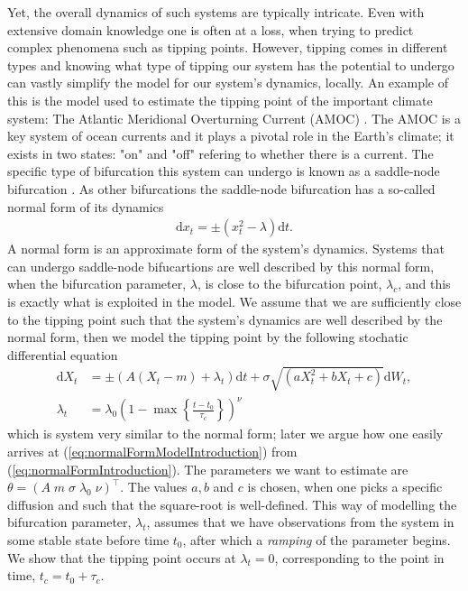 Yet, the overall dynamics of such systems are typically intricate. Even with extensive domain knowledge one is often at a loss, when trying to predict complex phenomena such as tipping points. However, tipping comes in different types and knowing what type of tipping our system has the potential to undergo can vastly simplify the model for our system's dynamics, locally. An example of this is the model used to estimate the tipping point of the important climate system: The Atlantic Meridional Overturning Current (AMOC) \cite{Ditlevsen2023}. The AMOC is a key system of ocean currents and it plays a pivotal role in the Earth's climate; it exists in two states: "on" and "off" refering to whether there is a current. The specific type of bifurcation this system can undergo is known as a saddle-node bifurcation \cite{Ditlevsen2023}\cite{Strogatz2019_gv}. As other bifurcations the saddle-node bifurcation has a so-called normal form of its dynamics 
\begin{align}
    \mathrm{d}x_t = \pm\left(x_t^2 - \lambda\right)\mathrm{d}t. \label{eq:normalFormIntroduction}
\end{align}
A normal form is an approximate form of the system's dynamics. Systems that can undergo saddle-node bifucartions are well described by this normal form, when the bifurcation parameter, $\lambda$, is close to the bifurcation point, $\lambda_c$, and this is exactly what is exploited in the model. We assume that we are sufficiently close to the tipping point such that the system's dynamics are well described by the normal form, then we model the tipping point by the following stochatic differential equation
\begin{align}
    \mathrm{d}X_t &= \pm(A(X_t - m) + \lambda_t)\mathrm{d}t + \sigma\sqrt{\left(aX_t^2 + bX_t + c\right)}\mathrm{d}W_t, \label{eq:normalFormModelIntroduction}\\
    \lambda_t &= \lambda_0\left(1 - \max\left\{\frac{t - t_0}{\tau_c}\right\}\right)^\nu \label{eq:lambdaRampDefinitionIntroduction}
\end{align}
which is system very similar to the normal form; later we argue how one easily arrives at (\ref{eq:normalFormModelIntroduction}) from (\ref{eq:normalFormIntroduction}). The parameters we want to estimate are $\theta = \left(A\; m\; \sigma\; \lambda_0\; \nu\right)^\top$. The values $a, b$ and $c$ is chosen, when one picks a specific diffusion and such that the square-root is well-defined. This way of modelling the bifurcation parameter, $\lambda_t$, assumes that we have observations from the system in some stable state before time $t_0$, after which a \textit{ramping} of the parameter begins. We show that the tipping point occurs at $\lambda_t = 0$, corresponding to the point in time, $t_c = t_0 + \tau_c$.

